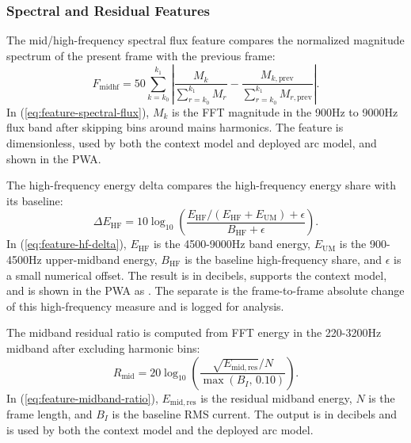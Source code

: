 \subsubsection{Spectral and Residual Features}
\label{sec:ch3-spectral-residual-features}

The mid/high-frequency spectral flux feature compares the normalized magnitude
spectrum of the present frame with the previous frame:
\begin{equation}
  F_{\mathrm{midhf}} =
  50\sum_{k=k_0}^{k_1}
  \left|
  \frac{M_k}{\sum_{r=k_0}^{k_1}M_r}
  -
  \frac{M_{k,\mathrm{prev}}}{\sum_{r=k_0}^{k_1}M_{r,\mathrm{prev}}}
  \right|.
  \label{eq:feature-spectral-flux}
\end{equation}
In (\ref{eq:feature-spectral-flux}), $M_k$ is the FFT magnitude in the
900Hz to 9000Hz flux band after skipping bins around mains harmonics. The
feature  is dimensionless, used by both the
context model and deployed arc model, and shown in the PWA.

The high-frequency energy delta compares the high-frequency energy share with
its baseline:
\begin{equation}
  \Delta E_{\mathrm{HF}} =
  10\log_{10}
  \left(
  \frac{E_{\mathrm{HF}}/(E_{\mathrm{HF}}+E_{\mathrm{UM}})+\epsilon}
       {B_{\mathrm{HF}}+\epsilon}
  \right).
  \label{eq:feature-hf-delta}
\end{equation}
In (\ref{eq:feature-hf-delta}), $E_{\mathrm{HF}}$ is the 4500-9000Hz band
energy, $E_{\mathrm{UM}}$ is the 900-4500Hz upper-midband energy,
$B_{\mathrm{HF}}$ is the baseline high-frequency share, and $\epsilon$ is a
small numerical offset. The result is in decibels, supports the context model,
and is shown in the PWA as . The separate
 is the frame-to-frame absolute change of this
high-frequency measure and is logged for analysis.

The midband residual ratio is computed from FFT energy in the 220-3200Hz
midband after excluding harmonic bins:
\begin{equation}
  R_{\mathrm{mid}} =
  20\log_{10}
  \left(
  \frac{\sqrt{E_{\mathrm{mid,res}}}/N}
       {\max(B_I,\,0.10)}
  \right).
  \label{eq:feature-midband-ratio}
\end{equation}
In (\ref{eq:feature-midband-ratio}), $E_{\mathrm{mid,res}}$ is the residual
midband energy, $N$ is the frame length, and $B_I$ is the baseline RMS
current. The output is in decibels and is used by both the context model and
the deployed arc model.

